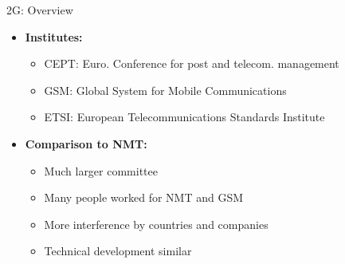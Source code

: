 \begin{frame}{2G: Overview}
  \begin{itemize}
    \item \textbf{Institutes:}
    \begin{itemize}
      \item CEPT: Euro. Conference for post and telecom. management
      \item GSM: Global System for Mobile Communications
      \item ETSI: European Telecommunications Standards Institute
    \end{itemize}
    \item \textbf{Comparison to NMT: \cite{Haugh2002}}
    \begin{itemize}
      \item Much larger committee
      \item Many people worked for NMT and GSM 
      \item More interference by countries and companies
      \item Technical development similar
    \end{itemize}
  \end{itemize}
  
\end{frame}

